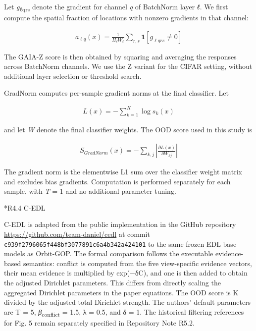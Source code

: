\documentclass[11pt,a4paper]{article}
\makeatletter
\renewcommand\subsection{\@startsection{subsection}{2}{\z@}{-1.8ex plus -.5ex minus -.2ex}{.7ex plus .2ex}{\normalfont\normalsize\bfseries\raggedright}}
\makeatother
\begin{document}
Let \emph{g}\textsubscript{ℓqrs} denote the gradient for channel \emph{q} of BatchNorm layer \emph{ℓ}. We first compute the spatial fraction of locations with nonzero gradients in that channel:

\begin{equation}
\begin{array}{r}
a_{\ell q}(x) = \frac{1}{H_{\ell}W_{\ell}}\sum_{r,s}^{}\mathbf{1}\left\lbrack g_{\ell qrs} \neq 0 \right\rbrack
\end{array}
\label{eq:supp22}
\end{equation}

The GAIA-Z score is then obtained by squaring and averaging the responses across BatchNorm channels. We use the Z variant for the CIFAR setting, without additional layer selection or threshold search.

GradNorm computes per-sample gradient norms at the final classifier. Let

\begin{equation}
\begin{array}{r}
L(x) = - \sum_{k = 1}^{K}{\log{s_{k}(x)}}
\end{array}
\label{eq:supp23}
\end{equation}

and let \emph{W} denote the final classifier weights. The OOD score used in this study is

\begin{equation}
\begin{array}{r}
S_{GradNorm}(x) = - \sum_{k,j}^{}\left| \frac{\partial L(x)}{\partial W_{kj}} \right|
\end{array}
\label{eq:supp24}
\end{equation}

The gradient norm is the elementwise L1 sum over the classifier weight matrix and excludes bias gradients. Computation is performed separately for each sample, with \emph{T} = 1 and no additional parameter tuning.

\subsection*{R4.4 C-EDL}\label{s4.4-c-edl}

C-EDL is adapted from the public implementation in the GitHub repository \url{https://github.com/team-daniel/cedl} at commit \texttt{c939f279\allowbreak{}6065f448\allowbreak{}bf307789\allowbreak{}1c6a4b34\allowbreak{}2a424101} to the same frozen EDL base models as Orbit-GOP. The formal comparison follows the executable evidence-based semantics: conflict is computed from the five view-specific evidence vectors, their mean evidence is multiplied by exp(−δC), and one is then added to obtain the adjusted Dirichlet parameters. This differs from directly scaling the aggregated Dirichlet parameters in the paper equations. The OOD score is K divided by the adjusted total Dirichlet strength. The authors' default parameters are T = 5, \emph{β}\textsubscript{conflict} = 1.5, λ = 0.5, and δ = 1. The historical filtering references for Fig. 5 remain separately specified in Repository Note R5.2.
\end{document}
